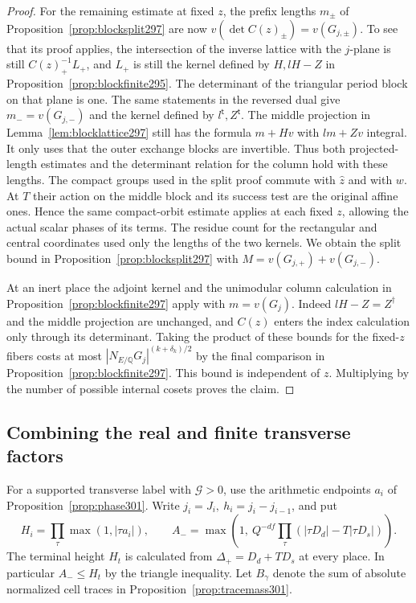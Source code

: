\documentclass[a4paper,11pt]{article}
\theoremstyle{definition}
\theoremstyle{remark}
\numberwithin{equation}{section}
\begin{document}
\begin{proof}
For the remaining estimate at fixed \(z\), the prefix
lengths \(m_\pm\) of Proposition~\ref{prop:blocksplit297}
are now \(v(\det C(z)_\pm)=v(G_{j,\pm})\). To see that
its proof applies, the intersection of the inverse lattice
with the \(j\)-plane is still \(C(z)_+^{-1}L_+\),
and \(L_+\) is still the kernel defined by \(H,lH-Z\)
in Proposition~\ref{prop:blockfinite295}. The determinant
of the triangular period block on that plane is one. The
same statements in the reversed dual give \(m_-=v(G_{j,-})\)
and the kernel defined by \(l^{\mathsf t},Z^{\mathsf t}\).
The middle projection in Lemma~\ref{lem:blocklattice297}
still has the formula \(m+Hv\) with \(lm+Zv\) integral.
It only uses that the outer exchange blocks are invertible.
Thus both projected-length estimates and the determinant
relation for the column hold with these lengths.
The compact groups used in the split proof commute with
\(\widehat z\) and with \(w\). At \(T\) their action on
the middle block and its success test are the original affine
ones. Hence the same compact-orbit estimate applies at each
fixed \(z\), allowing the actual scalar phases of its terms.
The residue count for the rectangular and central coordinates
used only the lengths of the two kernels. We obtain the split
bound in Proposition~\ref{prop:blocksplit297} with
\(M=v(G_{j,+})+v(G_{j,-})\).

At an inert place the adjoint kernel and the unimodular
column calculation in Proposition~\ref{prop:blockfinite297}
apply with \(m=v(G_j)\). Indeed \(lH-Z=Z^\dagger\) and
the middle projection are unchanged, and \(C(z)\) enters
the index calculation only through its determinant.
Taking the product of these bounds for the fixed-\(z\)
fibers costs at most \(|N_{E/\mathbb Q}G_j|^{(k+\delta_k)/2}\)
by the final comparison in Proposition~\ref{prop:blockfinite297}.
This bound is independent of \(z\). Multiplying by the
number of possible internal cosets proves the claim.
\end{proof}

\subsection{Combining the real and finite transverse factors}\label{nav:II-69}
For a supported transverse label with \(\mathcal G>0\), use the
arithmetic endpoints \(a_i\) of Proposition~\ref{prop:phase301}.
Write \(j_i=J_i,\ h_i=j_i-j_{i-1}\), and put
\[
 H_i=\prod_\tau\max(1,|\tau a_i|),\qquad
 A_-=\max\!\left(1,\ Q^{-df}\prod_\tau
                     (|\tau D_d|-T|\tau D_s|)\right).
\]
The terminal height \(H_t\) is calculated from
\(\Delta_+=D_d+TD_s\) at every place. In particular
\(A_-\le H_t\) by the triangle inequality.
Let \(B_\gamma\) denote the sum of absolute normalized
cell traces in Proposition~\ref{prop:tracemass301}.
\end{document}
